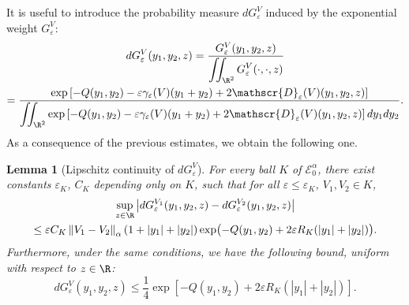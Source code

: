 \documentclass[JEP,XML,SOM,Unicode]{cedram}
\let\mathcal\mathscr
\theoremstyle{plain}
\newtheorem{lem}[thm]{Lemma}
\theoremstyle{definition}
\newcommand{\D}{\mathcal{D}_\eps}
\let\eps\varepsilon
\let\ds\displaystyle
\newcommand{\abs}[1]{\left\lvert#1\right\rvert}
\newcommand{\norm}[1]{\left\lVert#1\right\rVert}
\newcommand{\Eaz}{\mathcal{E}^\alpha_0}
\newcommand{\QV}{G_\eps^V}
\newcommand{\dQVA}{dG_\eps^{V_1}}
\newcommand{\dQVB}{dG_\eps^{V_2}}
\begin{document}
It is useful to introduce the probability measure $d\QV$ induced by the exponential weight $\QV$:
\begin{multline*}
d\QV(y_1,y_2,z) = \dfrac{\QV(y_1,y_2,z)}{\ds \iint_{\R^2} \QV(\cdot, \cdot, z)} \\
= \dfrac{\ds \exp\left[-Q(y_1,y_2) -\eps\gamma_\eps(V)(y_1+y_2) + 2 \D(V)(y_1,y_2,z) \right] } {\ds\iint_{\R^2} \exp\left[-Q(y_1,y_2)-\eps\gamma_\eps(V)(y_1+y_2) + 2 \D(V)(y_1,y_2,z) \right] d y_1 d y_2 }.
\end{multline*}
As a consequence of the previous estimates, we obtain the following one.
\begin{lem}[Lipschitz continuity of $d\QV$]\label{contraction measure lem}
For every ball $K$ of $\Eaz$, there exist constants $\eps_K$, $C_K$ depending only on $K$, such that for all $\eps \leq \eps_K $, $V_1, V_2 \in K$,
\begin{multline}\label{eq:cont_measure}
\sup_{z\in \R}\abs{\dQVA(y_1,y_2,z)-\dQVB(y_1,y_2,z)} \\
\leq \eps C_K \norm{V_1-V_2}_\alpha (1+ \abs{y_1} + \abs{y_2}) \exp \bigl(-Q(y_1,y_2) + 2 \eps R_K (\abs{y_1}+\abs{y_2}) \bigr).
\end{multline}
Furthermore, under the same conditions, we have the following bound, uniform with respect to $z \in \R $:
\begin{equation}\label{eq:control dQV}
d\QV(y_1,y_2,z) \leq \dfrac{1}{4}\exp\left[-Q(y_1,y_2) + 2 \eps R_K (\abs{y_1}+\abs{y_2}) \right].
\end{equation}
\end{lem}
\end{document}
